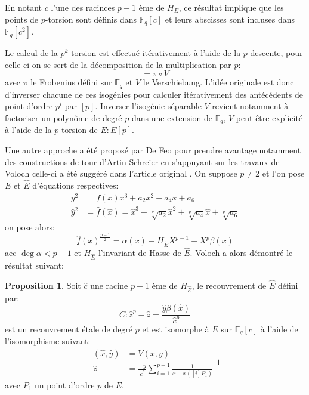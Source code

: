 \documentclass[10pt,a4paper]{book}
\theoremstyle{plain}
\theoremstyle{definition}
\theoremstyle{definition}
\theoremstyle{definition}
\newtheorem{prop}[thm]{Proposition}
\theoremstyle{definition}
\theoremstyle{remark}
\theoremstyle{remark}
\begin{document}
En notant $c$ l'une des racinces $p-1$ ème de $H_E$, ce résultat implique que les points de $p$-torsion sont définis dans $\mathbb{F}_q[c]$ et leurs abscisses sont incluses dans $\mathbb{F}_q[c^2]$.


Le calcul de la $p^k$-torsion est effectué itérativement à l'aide de la $p$-descente, pour celle-ci on se sert de la décomposition de la multiplication par $p$: 
\begin{equation}
[p]=\pi \circ V
\end{equation}
avec $\pi$ le Frobenius défini sur $\mathbb{F}_q$ et $V$ le Verschiebung. L'idée originale est donc d'inverser chacune  de ces isogénies pour calculer itérativement des antécédents de point d'ordre $p^i$ par $[p]$. Inverser l'isogénie séparable $V$ revient notamment à factoriser un polynôme de degré $p$ dans une extension de $\mathbb{F}_q$, $V$ peut être explicité à l'aide de la $p$-torsion de $E: E[p]$. 

Une autre approche a été proposé par De Feo pour prendre avantage notamment des constructions de tour d'Artin Schreier en s'appuyant sur les travaux de Voloch \cite{Voloch90} celle-ci a été suggéré dans l'article original \cite{Couveignes96}. On suppose $p\neq 2$ et l'on pose $E$ et $\widehat{E}$ d'équations respectives:
\begin{equation}
\begin{alignedat}{1}
y^2 &= f(x)x^3+a_2x^2+a_4x+a_6 \\
\widehat{y}^2 &= \widehat{f}(\widehat{x})=\widehat{x}^3+\sqrt[p]{a_2}\widehat{x}^2+\sqrt[p]{a_4}\widehat{x}+\sqrt[p]{a_6}
\end{alignedat}
\end{equation}
on pose alors:
\begin{equation}
\widehat{f}(x)^{\frac{p-1}{2}}=\alpha(x)+H_{\widehat{E}}X^{p-1}+X^{p}\beta(x)
\end{equation}
aec $\deg  \alpha <p-1$ et $H_{\widehat{E}}$ l'invariant de Hasse de $\widehat{E}$. Voloch a alors démontré le résultat suivant:
\begin{prop}
Soit $\widehat{c}$ une racine $p-1$ ème de $H_{\widehat{E}}$, le recouvrement de $\widehat{E}$ défini par:
\begin{equation}
\label{eq:vol:cov}
C:\widehat{z}^p-\widehat{z}=\frac{\widehat{y}\beta( \widehat{x})}{\widehat{c}^p}
\end{equation}
est un recouvrement étale de degré $p$ et est isomorphe à $E$ sur $\mathbb{F}_q[c]$ à l'aide de l'isomorphisme suivant:
\begin{equation}
\label{eq:vol:iso}
\begin{alignedat}{1}
(\widehat{x},\widehat{y}) &= V(x,y) \\
\widehat{z} &= \frac{-y}{\widehat{c}^p}\sum_{i=1}^{p-1}\frac{1}{x-x([i]P_1)}
\end{alignedat}{1}
\end{equation}
avec $P_1$ un point d'ordre $p$ de $E$.
\end{prop}
\end{document}
